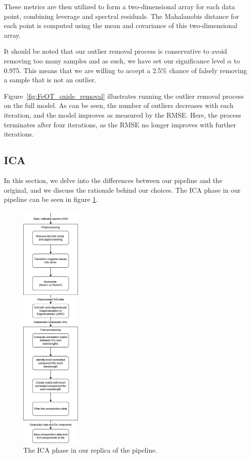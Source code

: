 These metrics are then utilized to form a two-dimensional array for each data point, combining leverage and spectral residuals.
The Mahalanobis distance for each point is computed using the mean and covariance of this two-dimensional array.

It should be noted that our outlier removal process is conservative to avoid removing too many samples and as such, we have set our significance level $\alpha$ to 0.975.
This means that we are willing to accept a 2.5\% chance of falsely removing a sample that is not an outlier.

Figure~\ref{fig:FeOT_oxide_removal} illustrates running the outlier removal process on the  full model.
As can be seen, the number of outliers decreases with each iteration, and the model improves as measured by the RMSE.
Here, the process terminates after four iterations, as the RMSE no longer improves with further iterations.

\subsection{ICA}\label{sec:methodology_ica}
In this section, we delve into the differences between our pipeline and the original, and we discuss the rationale behind our choices.
The ICA phase in our pipeline can be seen in figure \ref{fig:ica_phase}.

\begin{figure}
	\centering
	\includegraphics[width=0.2675\textwidth]{images/ica_phase.png}
	\caption{The ICA phase in our replica of the pipeline.}
	\label{fig:ica_phase}
\end{figure}

